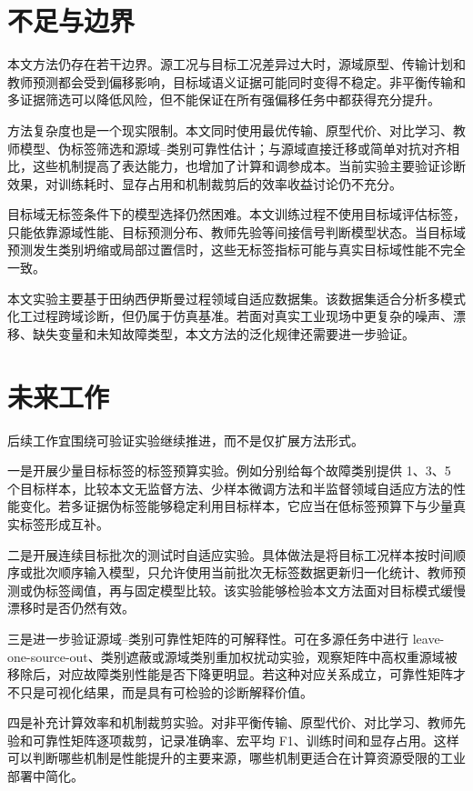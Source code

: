 \documentclass{seuthesis-2022}
\begin{document}
\section{不足与边界}

本文方法仍存在若干边界。源工况与目标工况差异过大时，源域原型、传输计划和教师预测都会受到偏移影响，目标域语义证据可能同时变得不稳定。非平衡传输和多证据筛选可以降低风险，但不能保证在所有强偏移任务中都获得充分提升。

方法复杂度也是一个现实限制。本文同时使用最优传输、原型代价、对比学习、教师模型、伪标签筛选和源域--类别可靠性估计；与源域直接迁移或简单对抗对齐相比，这些机制提高了表达能力，也增加了计算和调参成本。当前实验主要验证诊断效果，对训练耗时、显存占用和机制裁剪后的效率收益讨论仍不充分。

目标域无标签条件下的模型选择仍然困难。本文训练过程不使用目标域评估标签，只能依靠源域性能、目标预测分布、教师先验等间接信号判断模型状态。当目标域预测发生类别坍缩或局部过置信时，这些无标签指标可能与真实目标域性能不完全一致。

本文实验主要基于田纳西伊斯曼过程领域自适应数据集。该数据集适合分析多模式化工过程跨域诊断，但仍属于仿真基准。若面对真实工业现场中更复杂的噪声、漂移、缺失变量和未知故障类型，本文方法的泛化规律还需要进一步验证。

\section{未来工作}

后续工作宜围绕可验证实验继续推进，而不是仅扩展方法形式。

一是开展少量目标标签的标签预算实验。例如分别给每个故障类别提供 1、3、5 个目标样本，比较本文无监督方法、少样本微调方法和半监督领域自适应方法的性能变化。若多证据伪标签能够稳定利用目标样本，它应当在低标签预算下与少量真实标签形成互补。

二是开展连续目标批次的测试时自适应实验。具体做法是将目标工况样本按时间顺序或批次顺序输入模型，只允许使用当前批次无标签数据更新归一化统计、教师预测或伪标签阈值，再与固定模型比较。该实验能够检验本文方法面对目标模式缓慢漂移时是否仍然有效。

三是进一步验证源域--类别可靠性矩阵的可解释性。可在多源任务中进行 leave-one-source-out、类别遮蔽或源域类别重加权扰动实验，观察矩阵中高权重源域被移除后，对应故障类别性能是否下降更明显。若这种对应关系成立，可靠性矩阵才不只是可视化结果，而是具有可检验的诊断解释价值。

四是补充计算效率和机制裁剪实验。对非平衡传输、原型代价、对比学习、教师先验和可靠性矩阵逐项裁剪，记录准确率、宏平均 F1、训练时间和显存占用。这样可以判断哪些机制是性能提升的主要来源，哪些机制更适合在计算资源受限的工业部署中简化。
\end{document}
